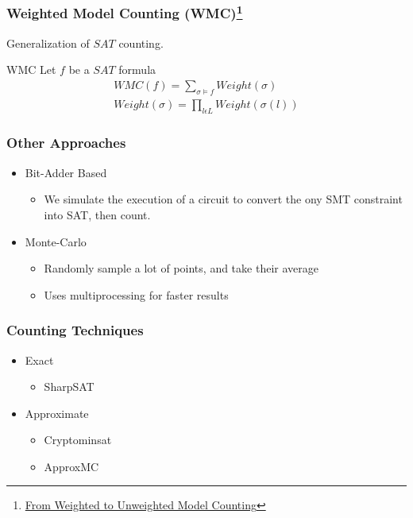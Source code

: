 \documentclass{beamer}
\begin{document}
\begin{frame}
\frametitle{Weighted Model Counting (WMC)\footnote{\href{http://ijcai.org/Proceedings/15/Papers/103.pdf}{From Weighted to Unweighted Model Counting}}}
	Generalization of $SAT$ counting.\\[3ex]
	\begin{block}{WMC}
	Let $f$ be a $SAT$ formula
	\begin{eqnarray}
		WMC(f) = \sum_{\sigma \vDash f}Weight(\sigma) \\
		Weight(\sigma) = \prod_{l \epsilon L}{Weight(\sigma(l))}
	\end{eqnarray}	
	\end{block}
\end{frame}


\begin{frame}
\frametitle{Other Approaches}
	\begin{itemize}
	\item Bit-Adder Based
		\begin{itemize}
		\item We simulate the execution of a circuit to convert the ony SMT constraint into SAT, then count.
		\end{itemize}
	
	\item Monte-Carlo
		\begin{itemize}
		\item Randomly sample a lot of points, and take their average
		\item Uses multiprocessing for faster results
		\end{itemize}
	\end{itemize}
\end{frame}



\begin{frame}
\frametitle{Counting Techniques}
\begin{itemize}
\item Exact
	\begin{itemize}
	\item SharpSAT
	\end{itemize}

\item Approximate
	\begin{itemize}
	\item Cryptominsat
	\item ApproxMC
	\end{itemize}
\end{itemize}
\end{frame}
\end{document}

